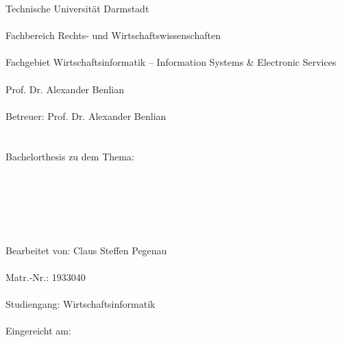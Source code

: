 %
%
%
%

\singlespacing 
\noindent Technische Universität Darmstadt \\\\
Fachbereich Rechts- und Wirtschaftswissenschaften \\\\
Fachgebiet Wirtschaftsinformatik -- Information Systems \& Electronic Services \\\\
Prof. Dr. Alexander Benlian \\\\
Betreuer: Prof. Dr. Alexander Benlian \\\\
\\
Bachelorthesis zu dem Thema: \\\\
\titel \\\\ 
\untertitel \\\\
\\
Bearbeitet von: Claus Steffen Pegenau \\\\
Matr.-Nr.: 1933040 \\\\
Studiengang: Wirtschaftsinformatik \\\\
Eingereicht am: \abgabedatum \\\\

\onehalfspacing

\setcounter{page}{2}